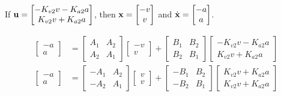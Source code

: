 If $\mathbf{u} =
\begin{bmatrix}
  -K_{v2} v - K_{a2} a \\
  K_{v2} v + K_{a2} a
\end{bmatrix}$, then $\mathbf{x} =
\begin{bmatrix}
  -v \\
  v
\end{bmatrix}$ and $\dot{\mathbf{x}} =
\begin{bmatrix}
  -a \\
  a
\end{bmatrix}$.

\begin{align*}
  \begin{bmatrix}
    -a \\
    a
  \end{bmatrix} &=
    \begin{bmatrix}
      A_1 & A_2 \\
      A_2 & A_1
    \end{bmatrix}
    \begin{bmatrix}
      -v \\
      v
    \end{bmatrix} +
    \begin{bmatrix}
      B_1 & B_2 \\
      B_2 & B_1
    \end{bmatrix}
    \begin{bmatrix}
      -K_{v2} v - K_{a2} a \\
      K_{v2} v + K_{a2} a
    \end{bmatrix} \\
  \begin{bmatrix}
    -a \\
    a
  \end{bmatrix} &=
    \begin{bmatrix}
      -A_1 & A_2 \\
      -A_2 & A_1
    \end{bmatrix}
    \begin{bmatrix}
      v \\
      v
    \end{bmatrix} +
    \begin{bmatrix}
      -B_1 & B_2 \\
      -B_2 & B_1
    \end{bmatrix}
    \begin{bmatrix}
      K_{v2} v + K_{a2} a \\
      K_{v2} v + K_{a2} a
    \end{bmatrix} \\

\end{align*}
